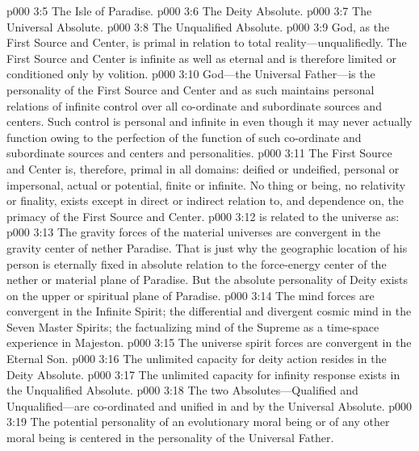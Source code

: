 \vs p000 3:5 \bibnobreakspace The Isle of Paradise.
\vs p000 3:6 \bibnobreakspace The Deity Absolute.
\vs p000 3:7 \bibnobreakspace The Universal Absolute.
\vs p000 3:8 \bibnobreakspace The Unqualified Absolute.
\pc \vs p000 3:9 God, as the First Source and Center, is primal in relation to total reality---unqualifiedly. The First Source and Center is infinite as well as eternal and is therefore limited or conditioned only by volition.
\vs p000 3:10 God---the Universal Father---is the personality of the First Source and Center and as such maintains personal relations of infinite control over all co\hyp{}ordinate and subordinate sources and centers. Such control is personal and infinite in  even though it may never actually function owing to the perfection of the function of such co\hyp{}ordinate and subordinate sources and centers and personalities.
\vs p000 3:11 The First Source and Center is, therefore, primal in all domains: deified or undeified, personal or impersonal, actual or potential, finite or infinite. No thing or being, no relativity or finality, exists except in direct or indirect relation to, and dependence on, the primacy of the First Source and Center.\plusone
\pc \vs p000 3:12  is related to the universe as:
\pc \vs p000 3:13 \bibnobreakspace The gravity forces of the material universes are convergent in the gravity center of nether Paradise. That is just why the geographic location of his person is eternally fixed in absolute relation to the force\hyp{}energy center of the nether or material plane of Paradise. But the absolute personality of Deity exists on the upper or spiritual plane of Paradise.
\vs p000 3:14 \bibnobreakspace The mind forces are convergent in the Infinite Spirit; the differential and divergent cosmic mind in the Seven Master Spirits; the factualizing mind of the Supreme as a time\hyp{}space experience in Majeston.
\vs p000 3:15 \bibnobreakspace The universe spirit forces are convergent in the Eternal Son.
\vs p000 3:16 \bibnobreakspace The unlimited capacity for deity action resides in the Deity Absolute.
\vs p000 3:17 \bibnobreakspace The unlimited capacity for infinity response exists in the Unqualified Absolute.
\vs p000 3:18 \bibnobreakspace The two Absolutes---Qualified and Unqualified---are co\hyp{}ordinated and unified in and by the Universal Absolute.
\vs p000 3:19 \bibnobreakspace The potential personality of an evolutionary moral being or of any other moral being is centered in the personality of the Universal Father.
